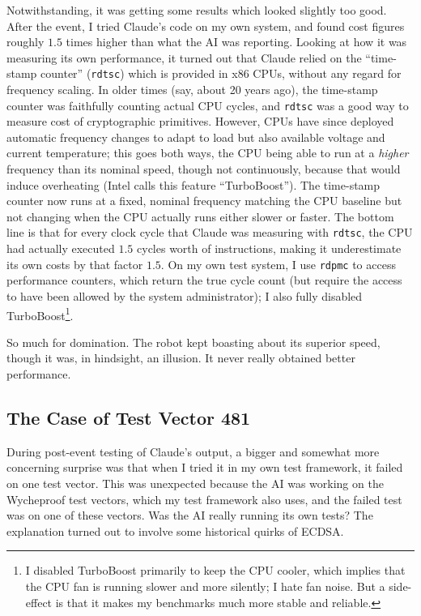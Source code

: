 \documentclass{llncs}
\begin{document}
Notwithstanding, it was getting some results which looked slightly too
good. After the event, I tried Claude's code on my own system, and found
cost figures roughly $1.5$ times higher than what the AI was reporting.
Looking at how it was measuring its own performance, it turned out that
Claude relied on the ``time-stamp counter'' (\verb+rdtsc+) which is
provided in x86 CPUs, without any regard for frequency scaling. In older
times (say, about 20 years ago), the time-stamp counter was faithfully
counting actual CPU cycles, and \verb+rdtsc+ was a good way to measure
cost of cryptographic primitives. However, CPUs have since deployed
automatic frequency changes to adapt to load but also available voltage
and current temperature; this goes both ways, the CPU being able to run
at a \emph{higher} frequency than its nominal speed, though not
continuously, because that would induce overheating (Intel calls this
feature ``TurboBoost''). The time-stamp counter now runs at a fixed,
nominal frequency matching the CPU baseline but not changing when the
CPU actually runs either slower or faster. The bottom line is that for
every clock cycle that Claude was measuring with \verb+rdtsc+, the CPU
had actually executed $1.5$ cycles worth of instructions, making it
underestimate its own costs by that factor $1.5$. On my own test system,
I use \verb+rdpmc+ to access performance counters, which return the true
cycle count (but require the access to have been allowed by the system
administrator); I also fully disabled TurboBoost\footnote{I disabled
TurboBoost primarily to keep the CPU cooler, which implies that the CPU
fan is running slower and more silently; I hate fan noise. But a
side-effect is that it makes my benchmarks much more stable and
reliable.}.

So much for domination. The robot kept boasting about its superior speed,
though it was, in hindsight, an illusion. It never really obtained better
performance.

\subsection{The Case of Test Vector 481}

During post-event testing of Claude's output, a bigger and somewhat more
concerning surprise was that when I tried it in my own test framework,
it failed on one test vector. This was unexpected because the AI was
working on the Wycheproof test vectors, which my test framework also
uses, and the failed test was on one of these vectors. Was the AI really
running its own tests? The explanation turned out to involve some
historical quirks of ECDSA.
\end{document}
